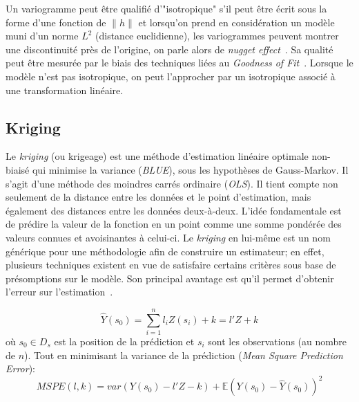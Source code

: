 Un variogramme peut être qualifié d'"isotropique" s'il peut être écrit sous la forme d'une fonction de $\| h \|$ et lorsqu'on prend en considération un modèle muni d'un norme $L^{2}$ (distance euclidienne), les variogrammes peuvent montrer une discontinuité près de l'origine, on parle alors de \textit{nugget effect}~\cite{cressie2015statistics}. Sa qualité peut être mesurée par le biais des techniques liées au \textit{Goodness of Fit}~\cite{diggle2013statistical}. Lorsque le modèle n'est pas isotropique, on peut l'approcher par un isotropique associé à une transformation linéaire.

\subsection{Kriging}\label{Kriging}

Le \textit{kriging} (ou krigeage) est une méthode d'estimation linéaire optimale non-biaisé qui minimise la variance (\textit{BLUE}), sous les hypothèses de Gauss-Markov. Il s'agit d'une méthode des moindres carrés ordinaire (\textit{OLS}). Il tient compte non seulement de la distance entre les données et le point d'estimation, mais également des distances entre les données deux-à-deux. L'idée fondamentale est de prédire la valeur de la fonction en un point comme une somme pondérée des valeurs connues et avoisinantes à celui-ci. Le \textit{kriging} en lui-même est un nom générique pour une méthodologie afin de construire un estimateur; en effet, plusieurs techniques existent en vue de satisfaire certains critères sous base de présomptions sur le modèle. Son principal avantage est qu'il permet d'obtenir l'erreur sur l'estimation~\cite{cressie1990origins}.

\begin{equation}
    \hat{Y}(s_{0}) = \sum_{i = 1}^{n} l_{i} Z(s_{i}) + k = l'Z + k
\end{equation}
où $s_{0} \in D_{s}$ est la position de la prédiction et $s_{i}$ sont les observations (au nombre de $n$). Tout en minimisant la variance de la prédiction (\textit{Mean Square Prediction Error}):
\begin{equation}
    MSPE(l, k) = var(Y(s_{0}) - l'Z - k) + \mathbb{E}(Y(s_{0}) - \hat{Y}(s_{0}))^{2}
\end{equation}

